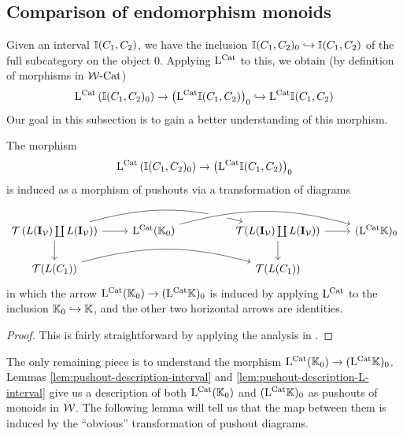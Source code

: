 \documentclass[12pt]{amsart}
\begin{document}
\subsection{Comparison of endomorphism monoids}
Given an interval $\mathbb{I}(C_1,C_2)$, we have the inclusion $\mathbb{I}(C_1,C_2)_0 \hookrightarrow \mathbb{I}(C_1,C_2)$ of the full subcategory on the object $0$. 
Applying $\mathrm{L}^{\mathrm{Cat}}$ to this, we obtain (by definition of morphisms in $\mathcal{W}\text{-}\mathrm{Cat}$)
$$\mathrm{L}^{\mathrm{Cat}}\left(\mathbb{I}(C_1,C_2)_0\right) \to \left(\mathrm{L}^{\mathrm{Cat}} \mathbb{I}(C_1,C_2) \right)_0 \hookrightarrow \mathrm{L}^{\mathrm{Cat}} \mathbb{I}(C_1,C_2)$$
Our goal in this subsection is to gain a better understanding of this morphism.
\begin{lemma}\label{lem:last-pushout-comparison-step}
	The morphism 
	$$\mathrm{L}^{\mathrm{Cat}}\left(\mathbb{I}(C_1,C_2)_0\right) \to \left(\mathrm{L}^{\mathrm{Cat}} \mathbb{I}(C_1,C_2) \right)_0$$
	is induced as a morphism of pushouts via a transformation of diagrams 
	\begin{equation}\label{eqn:diagram-transformation-last-step}
	\begin{tikzcd}
	\T\left(L(\iv) \coprod L(\iv) \right) \ar[d] \ar[r] \ar[rrr, bend left = 15 ]
		& \lcat(\K_0)
		& & 
		\T(L(\iv) \coprod L(\iv)) \ar[d] \ar[r] 
		& (\lcat \K)_0 \arrow[from=lll, bend left = 15, crossing over]
	\\
	\T(L(C_1))	\ar[rrr, bend left = 15]
		& & &
	\T(L(C_1))	
	\end{tikzcd}
	\end{equation}	
	in which the arrow $\mathrm{L}^{\mathrm{Cat}}(\mathbb{K}_0) \to (\mathrm{L}^{\mathrm{Cat}} \mathbb{K})_0$ is induced by applying $\mathrm{L}^{\mathrm{Cat}}$ to the inclusion $\mathbb{K}_0 \hookrightarrow \mathbb{K}$, and the other two horizontal arrows are identities. 
\end{lemma}
\begin{proof}
	This is fairly straightforward by applying the analysis in \cite[Section 3.8]{BergerMoerdijk2012}. 
\end{proof}
The only remaining piece is to understand the morphism $\mathrm{L}^{\mathrm{Cat}}(\mathbb{K}_0) \to (\mathrm{L}^{\mathrm{Cat}} \mathbb{K})_0$. 
Lemmas \ref{lem:pushout-description-interval} and \ref{lem:pushout-description-L-interval} give us a description of both $\mathrm{L}^{\mathrm{Cat}}(\mathbb{K}_0)$ and $(\mathrm{L}^{\mathrm{Cat}} \mathbb{K})_0$ as pushouts of monoids in $\mathcal{W}$.
The following lemma will tell us that the map between them is induced by the ``obvious'' transformation of pushout diagrams.
\end{document}
